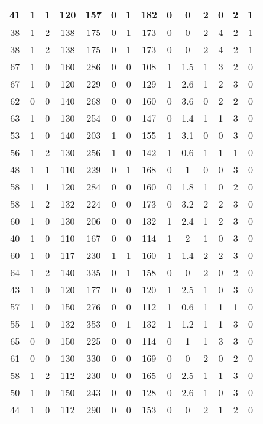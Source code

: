 \documentclass{article}
\begin{document}
\begin{longtable}{|c|c|c|c|c|c|c|c|c|c|c|c|c|c|}
41 & 1 & 1 & 120 & 157 & 0 & 1 & 182 & 0 & 0 & 2 & 0 & 2 & 1 \\ \hline
38 & 1 & 2 & 138 & 175 & 0 & 1 & 173 & 0 & 0 & 2 & 4 & 2 & 1 \\ \hline
38 & 1 & 2 & 138 & 175 & 0 & 1 & 173 & 0 & 0 & 2 & 4 & 2 & 1 \\ \hline
67 & 1 & 0 & 160 & 286 & 0 & 0 & 108 & 1 & 1.5 & 1 & 3 & 2 & 0 \\ \hline
67 & 1 & 0 & 120 & 229 & 0 & 0 & 129 & 1 & 2.6 & 1 & 2 & 3 & 0 \\ \hline
62 & 0 & 0 & 140 & 268 & 0 & 0 & 160 & 0 & 3.6 & 0 & 2 & 2 & 0 \\ \hline
63 & 1 & 0 & 130 & 254 & 0 & 0 & 147 & 0 & 1.4 & 1 & 1 & 3 & 0 \\ \hline
53 & 1 & 0 & 140 & 203 & 1 & 0 & 155 & 1 & 3.1 & 0 & 0 & 3 & 0 \\ \hline
56 & 1 & 2 & 130 & 256 & 1 & 0 & 142 & 1 & 0.6 & 1 & 1 & 1 & 0 \\ \hline
48 & 1 & 1 & 110 & 229 & 0 & 1 & 168 & 0 & 1 & 0 & 0 & 3 & 0 \\ \hline
58 & 1 & 1 & 120 & 284 & 0 & 0 & 160 & 0 & 1.8 & 1 & 0 & 2 & 0 \\ \hline
58 & 1 & 2 & 132 & 224 & 0 & 0 & 173 & 0 & 3.2 & 2 & 2 & 3 & 0 \\ \hline
60 & 1 & 0 & 130 & 206 & 0 & 0 & 132 & 1 & 2.4 & 1 & 2 & 3 & 0 \\ \hline
40 & 1 & 0 & 110 & 167 & 0 & 0 & 114 & 1 & 2 & 1 & 0 & 3 & 0 \\ \hline
60 & 1 & 0 & 117 & 230 & 1 & 1 & 160 & 1 & 1.4 & 2 & 2 & 3 & 0 \\ \hline
64 & 1 & 2 & 140 & 335 & 0 & 1 & 158 & 0 & 0 & 2 & 0 & 2 & 0 \\ \hline
43 & 1 & 0 & 120 & 177 & 0 & 0 & 120 & 1 & 2.5 & 1 & 0 & 3 & 0 \\ \hline
57 & 1 & 0 & 150 & 276 & 0 & 0 & 112 & 1 & 0.6 & 1 & 1 & 1 & 0 \\ \hline
55 & 1 & 0 & 132 & 353 & 0 & 1 & 132 & 1 & 1.2 & 1 & 1 & 3 & 0 \\ \hline
65 & 0 & 0 & 150 & 225 & 0 & 0 & 114 & 0 & 1 & 1 & 3 & 3 & 0 \\ \hline
61 & 0 & 0 & 130 & 330 & 0 & 0 & 169 & 0 & 0 & 2 & 0 & 2 & 0 \\ \hline
58 & 1 & 2 & 112 & 230 & 0 & 0 & 165 & 0 & 2.5 & 1 & 1 & 3 & 0 \\ \hline
50 & 1 & 0 & 150 & 243 & 0 & 0 & 128 & 0 & 2.6 & 1 & 0 & 3 & 0 \\ \hline
44 & 1 & 0 & 112 & 290 & 0 & 0 & 153 & 0 & 0 & 2 & 1 & 2 & 0 \\ \hline

\end{longtable}
\end{document}
